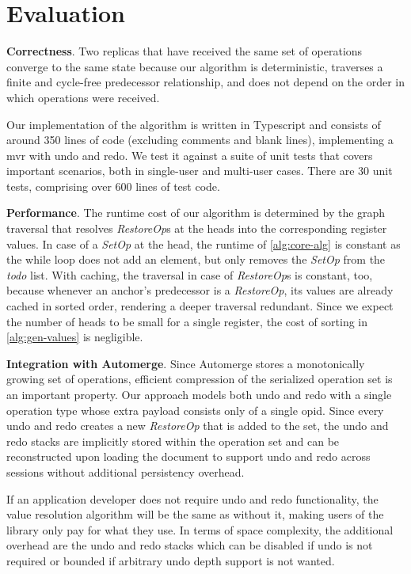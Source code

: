 \documentclass[sigplan,natbib=false,review]{acmart}
\newcommand{\setopkind}{\textit{SetOp}}
\newcommand{\restopkind}{\textit{RestoreOp}}
\begin{document}
\section{Evaluation}\label{sec:evaluation}

\textbf{Correctness}.
Two replicas that have received the same set of
operations converge to the same state because our algorithm is deterministic,
traverses a finite and cycle-free predecessor relationship,
and does not depend on the order in which operations were received.

Our implementation of the algorithm is written in Typescript and
consists of around 350 lines of code (excluding comments and blank lines),
implementing a \gls*{mvr} with undo and redo.
We test it against a suite of unit tests that covers important
scenarios, both in single-user and multi-user cases.
There are 30 unit tests, comprising over 600 lines of test code.

\textbf{Performance}.
The runtime cost of our algorithm is determined by the graph traversal that
resolves \restopkind{}s at the heads into the corresponding register values.
In case of a \setopkind{} at the head, the runtime of \cref{alg:core-alg}
is constant as the while loop does not add an element, but only
removes the \setopkind{} from the \textit{todo} list.
With caching, the traversal in case of \restopkind{}s is constant, too,
because whenever an anchor's predecessor is a \restopkind{},
its values are already cached in sorted order,
rendering a deeper traversal redundant.
Since we expect the number of heads to be small for a single register,
the cost of sorting in \cref{alg:gen-values} is negligible.

\textbf{Integration with Automerge}.
Since Automerge stores a monotonically growing set of operations,
efficient compression of the serialized operation set is an important property.
Our approach models both undo and redo with a single
operation type whose extra payload consists only of a single \gls*{opid}.
Since every undo and redo creates a new \restopkind{} that is added
to the set,
the undo and redo stacks are implicitly stored within the operation set and
can be reconstructed upon loading the document to support undo and redo
across sessions without additional persistency overhead.

If an application developer does not require undo and redo functionality,
the value resolution algorithm will be the same as without it,
making users of the library only pay for what they use.
In terms of space complexity, the additional overhead are
the undo and redo stacks which can be disabled if undo is not required or
bounded if arbitrary undo depth support is not wanted.
\end{document}
